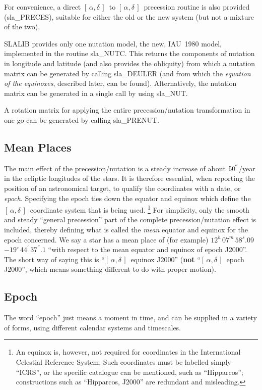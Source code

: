 \documentclass[11pt,twoside]{article}
\newcommand{\radec}     {$[\,\alpha,\delta\,]$}
\newcommand{\arcsec}[2] {\arcseci{#1}$\hspace{-0.4em}.#2$}
\newcommand{\arcsec}[2] {
      {$#1\hspace{-0.05em}^{'\hspace{-0.1em}'}\hspace{-0.4em}.#2$}
   }
\newcommand{\arcseci}[1] {$#1\hspace{-0.05em}$\raisebox{-0.5ex}
                         {$^{'\hspace{-0.1em}'}$}}
\renewcommand{\arcseci}[1] {$#1\hspace{-0.05em}^{'\hspace{-0.1em}'}$}
\newcommand{\dms}[4]    {$#1^{\circ}\,#2\raisebox{-0.5ex}
                        {$^{'}$}\,$\arcsec{#3}{#4}}
\renewcommand{\dms}[4]{$#1^{\circ}\,#2^{'}\,#3^{''}.#4$}
\newcommand{\tseci}[1]   {$#1$\mbox{$^{\rm s}$}}
\newcommand{\tsec}[2]    {\tseci{#1}$\hspace{-0.3em}.#2$}
\renewcommand{\tsec}[2] {$#1^{\rm s}\hspace{-0.3em}.#2$}
\newcommand{\hms}[4]    {$#1^{\rm h}\,#2^{\rm m}\,$\tsec{#3}{#4}}
\renewcommand{\hms}[4] {$#1^{h}\,#2^{m}\,#3^{s}.#4$}
\begin{document}
For convenience, a direct \radec\ to \radec\ precession routine is
also provided
(sla\_PRECES),
suitable for either the old or the new system (but not a
mixture of the two).

SLALIB provides only one nutation model, the new, IAU~1980 model,
implemented in the routine
sla\_NUTC.
This returns the components of nutation
in longitude and latitude (and also provides the obliquity) from
which a nutation matrix can be generated by calling
sla\_DEULER
(and from which the {\it equation of the equinoxes}, described
later, can be found).  Alternatively,
the nutation matrix can be generated in a single call by using
sla\_NUT.

A rotation matrix for applying the entire precession/nutation
transformation in one go can be generated by calling
sla\_PRENUT.

\subsection{Mean Places}
The main effect of the precession/nutation is a steady increase of about
\arcseci{50}/year in the ecliptic longitudes of the stars.  It is therefore
essential, when reporting the position of an astronomical target, to
qualify the coordinates with a date, or {\it epoch}.
Specifying the epoch ties down the equator and
equinox which define the \radec\ coordinate system that is
being used.
\footnote{An equinox is, however, not required for coordinates
in the International Celestial Reference System.  Such coordinates must
be labelled simply ``ICRS'', or the specific catalogue can be mentioned,
such as ``Hipparcos'';  constructions such as ``Hipparcos, J2000'' are
redundant and misleading.}  For simplicity, only
the smooth and steady ``general
precession'' part of the complete precession/nutation effect is
included, thereby defining what is called the {\it mean}\/
equator and equinox for the epoch concerned.  We say a star
has a mean place of (for example)
\hms{12}{07}{58}{09}~\dms{-19}{44}{37}{1} ``with respect to the mean equator
and equinox of epoch J2000''.  The short way of saying
this is ``\radec\ equinox J2000'' ({\bf not} ``\radec\ epoch J2000'', 
which means something different to do with
proper motion).

\subsection{Epoch}
The word ``epoch'' just means a moment in time, and can be supplied
in a variety of forms, using different calendar systems and timescales.
\end{document}
